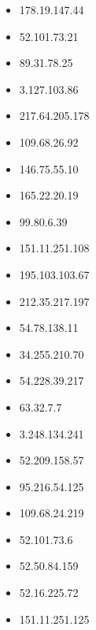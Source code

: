 \documentclass{article}
\begin{document}
\begin{itemize}
        \item 178.19.147.44
    
        \item 52.101.73.21
    
        \item 89.31.78.25
    
        \item 3.127.103.86
    
        \item 217.64.205.178
    
        \item 109.68.26.92
    
        \item 146.75.55.10
    
        \item 165.22.20.19
    
        \item 99.80.6.39
    
        \item 151.11.251.108
    
        \item 195.103.103.67
    
        \item 212.35.217.197
    
        \item 54.78.138.11
    
        \item 34.255.210.70
    
        \item 54.228.39.217
    
        \item 63.32.7.7
    
        \item 3.248.134.241
    
        \item 52.209.158.57
    
        \item 95.216.54.125
    
        \item 109.68.24.219
    
        \item 52.101.73.6
    
        \item 52.50.84.159
    
        \item 52.16.225.72
    
        \item 151.11.251.125
    

\end{itemize}
\end{document}
